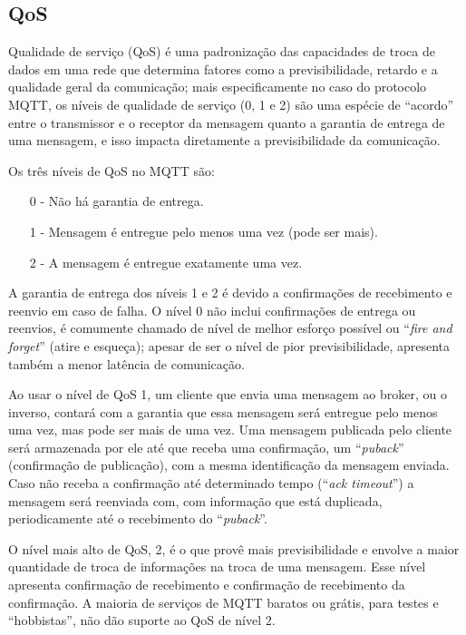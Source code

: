 \subsection{QoS}

Qualidade de serviço (\acl{QoS}) é uma padronização das capacidades de troca de dados em uma rede que determina fatores como a previsibilidade, retardo e a qualidade geral da comunicação; mais especificamente no caso do protocolo MQTT, os níveis de qualidade de serviço (0, 1 e 2) são uma espécie de “acordo” entre o transmissor e o receptor da mensagem quanto a garantia de entrega de uma mensagem, e isso impacta diretamente a previsibilidade da comunicação.

Os três níveis de QoS no MQTT são:
\begin{itemize}
    \item[0 -] Não há garantia de entrega.
    \item[1 -] Mensagem é entregue pelo menos uma vez (pode ser mais).
    \item[2 -] A mensagem é entregue exatamente uma vez.
\end{itemize}

A garantia de entrega dos níveis 1 e 2 é devido a confirmações de recebimento e reenvio em caso de falha. O nível 0 não inclui confirmações de entrega ou reenvios, é comumente chamado de nível de melhor esforço possível ou “\textit{fire and forget}” (atire e esqueça); apesar de ser o nível de pior previsibilidade, apresenta também a menor latência de comunicação.

Ao usar o nível de QoS 1, um cliente que envia uma mensagem ao broker, ou o inverso, contará com a garantia que essa mensagem será entregue pelo menos uma vez, mas pode ser mais de uma vez. Uma mensagem publicada pelo cliente será armazenada por ele até que receba uma confirmação, um “\textit{puback}” (confirmação de publicação), com a mesma identificação da mensagem enviada. Caso não receba a confirmação até determinado tempo (“\textit{ack timeout}”) a mensagem será reenviada com, com informação que está duplicada, periodicamente até o recebimento do “\textit{puback}”.

O nível mais alto de QoS, 2, é o que provê mais previsibilidade e envolve a maior quantidade de troca de informações na troca de uma mensagem. Esse nível apresenta confirmação de recebimento e confirmação de recebimento da confirmação. A maioria de serviços de MQTT baratos ou grátis, para testes e ``hobbistas'', não dão suporte ao QoS de nível 2.

